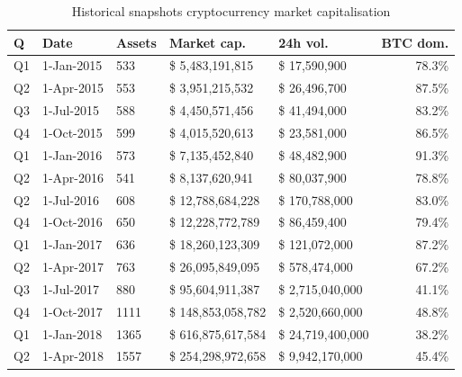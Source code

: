 \begin{table}[ht]
\centering
\caption{Historical snapshots cryptocurrency market capitalisation}
\begin{tabular}{@{}lllllr@{}}

             \toprule
\textbf{Q} & \textbf{Date} & \textbf{Assets} & \textbf{Market cap.} & \textbf{24h vol.} & \textbf{BTC dom.} \\
\midrule
      
Q1       & 1-Jan-2015     & 533           & \$          5,483,191,815 & \$                 17,590,900 & 78.3\%  \\
Q2       & 1-Apr-2015     & 553           & \$          3,951,215,532 & \$                 26,496,700 & 87.5\%  \\
Q3       & 1-Jul-2015     & 588           & \$          4,450,571,456 & \$                 41,494,000 & 83.2\%  \\
Q4       & 1-Oct-2015     & 599           & \$          4,015,520,613 & \$                 23,581,000 & 86.5\%  \\
Q1       & 1-Jan-2016     & 573           & \$          7,135,452,840 & \$                 48,482,900 & 91.3\%  \\
Q2       & 1-Apr-2016     & 541           & \$          8,137,620,941 & \$                 80,037,900 & 78.8\%  \\
Q2       & 1-Jul-2016     & 608           & \$        12,788,684,228  & \$              170,788,000   & 83.0\%  \\
Q4       & 1-Oct-2016     & 650           & \$        12,228,772,789  & \$                 86,459,400 & 79.4\%  \\
Q1       & 1-Jan-2017     & 636           & \$        18,260,123,309  & \$              121,072,000   & 87.2\%  \\
Q2       & 1-Apr-2017     & 763           & \$        26,095,849,095  & \$              578,474,000   & 67.2\%  \\
Q3       & 1-Jul-2017     & 880           & \$        95,604,911,387  & \$           2,715,040,000    & 41.1\%  \\
Q4       & 1-Oct-2017     & 1111          & \$     148,853,058,782    & \$           2,520,660,000    & 48.8\%  \\
Q1       & 1-Jan-2018     & 1365          & \$     616,875,617,584    & \$        24,719,400,000      & 38.2\%  \\
Q2       & 1-Apr-2018     & 1557          & \$     254,298,972,658    & \$           9,942,170,000    & 45.4\% \\

\end{tabular}
\end{table}
